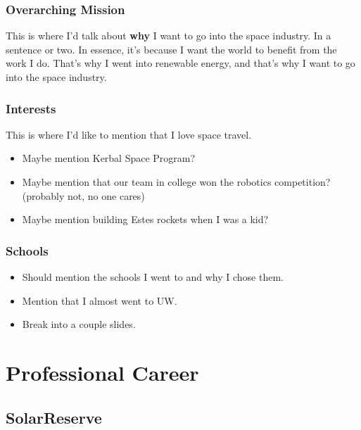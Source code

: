 \documentclass[aspectratio=169]{beamer}
\begin{document}
\begin{frame}
  \frametitle{Overarching Mission}
  This is where I'd talk about \textbf{why} I want to go into the space industry.  In a sentence or two.  In essence, it's because I want the world to benefit from the work I do.  That's why I went into renewable energy, and that's why I want to go into the space industry.  
\end{frame}

\begin{frame}
  \frametitle{Interests}
  This is where I'd like to mention that I love space travel.
  \begin{itemize}
  \item Maybe mention Kerbal Space Program?
  \item Maybe mention that our team in college won the robotics competition?  (probably not, no one cares)
  \item Maybe mention building Estes rockets when I was a kid?
  \end{itemize}
\end{frame}

\begin{frame}
  \frametitle{Schools}
  \begin{itemize}
  \item Should mention the schools I went to and why I chose them.
  \item Mention that I almost went to UW.
  \item Break into a couple slides.
  \end{itemize}
\end{frame}

\section{Professional Career}



\subsection{SolarReserve}
\end{document}
